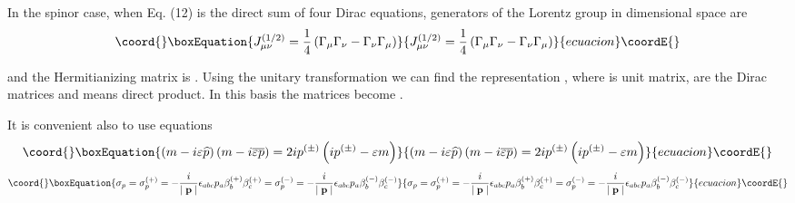 \documentclass[a4paper,12pt]{article}
\begin{document}
In the spinor case, when Eq. (12) is the direct sum of four Dirac equations,
generators of the Lorentz group in \coordHE{}dimensional space are
\begin{equation}\coord{}\boxEquation{
J_{\mu \nu }^{(1/2)}=\frac 14\left( \Gamma _\mu \Gamma _\nu -\Gamma _\nu
\Gamma _\mu \right)  \label{37}
}{
J_{\mu \nu }^{(1/2)}=\frac 14\left( \Gamma _\mu \Gamma _\nu -\Gamma _\nu
\Gamma _\mu \right)  }{ecuacion}\coordE{}\end{equation}

and the Hermitianizing matrix is \coordHE{}. Using the
unitary transformation we can find the representation \coordHE{}, where \coordHE{} is \coordHE{}unit matrix, \myHighlight{$\gamma
_\mu $}\coordHE{} are the Dirac matrices and \myHighlight{$\otimes $}\coordHE{} means direct product. In this
basis the matrices \myHighlight{$\overline{\Gamma }_\mu $}\coordHE{} become \coordHE{}.

It is convenient also to use equations
\begin{equation}\coord{}\boxEquation{
\left( m-i\varepsilon \widehat{p}\right) \left(
m-i\overline{\varepsilon } \overline{p}\right) =2ip^{(\pm )}\left(
ip^{(\pm )}-\varepsilon m\right) \label{38}
}{
\left( m-i\varepsilon \widehat{p}\right) \left(
m-i\overline{\varepsilon } \overline{p}\right) =2ip^{(\pm )}\left(
ip^{(\pm )}-\varepsilon m\right) }{ecuacion}\coordE{}\end{equation}
\begin{equation}\coord{}\boxEquation{
\sigma _p=\sigma _p^{(+)}=-\frac i{\mid \mathbf{p}\mid }\epsilon
_{abc}p_a\beta _b^{(+)}\beta _c^{(+)}=\sigma _p^{(-)}=-\frac
i{\mid \mathbf{p }\mid }\epsilon _{abc}p_a\beta _b^{(-)}\beta
_c^{(-)}  \label{39}
}{
\sigma _p=\sigma _p^{(+)}=-\frac i{\mid \mathbf{p}\mid }\epsilon
_{abc}p_a\beta _b^{(+)}\beta _c^{(+)}=\sigma _p^{(-)}=-\frac
i{\mid \mathbf{p }\mid }\epsilon _{abc}p_a\beta _b^{(-)}\beta
_c^{(-)}  }{ecuacion}\coordE{}\end{equation}
\end{document}
